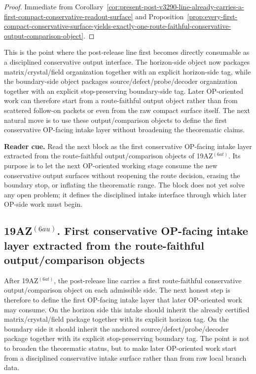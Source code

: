 \begin{proof}
Immediate from Corollary~\ref{cor:present-post-v3290-line-already-carries-a-first-compact-conservative-readout-surface} and Proposition~\ref{prop:every-first-compact-conservative-surface-yields-exactly-one-route-faithful-conservative-output-comparison-object}.
\end{proof}

\begin{remark}
\label{rem:what-the-first-route-faithful-conservative-output-comparison-layer-now-buys}
This is the point where the post-release line first becomes directly consumable as a disciplined conservative output interface. The horizon-side object now packages matrix/crystal/field organization together with an explicit horizon-side tag, while the boundary-side object packages source/defect/probe/decoder organization together with an explicit stop-preserving boundary-side tag. Later OP-oriented work can therefore start from a route-faithful output object rather than from scattered follow-on packets or even from the raw compact surface itself. The next natural move is to use these output/comparison objects to define the first conservative OP-facing intake layer without broadening the theorematic claims.
\end{remark}


\noindent\textbf{Reader cue.} Read the next block as the first conservative OP-facing intake layer extracted from the route-faithful output/comparison objects of 19AZ$^{(6at)}$. Its purpose is to let the next OP-oriented working stage consume the new conservative output surfaces without reopening the route decision, erasing the boundary stop, or inflating the theorematic range. The block does not yet solve any open problem; it defines the disciplined intake interface through which later OP-side work must begin.

\subsection*{19AZ$^{(6au)}$. First conservative OP-facing intake layer extracted from the route-faithful output/comparison objects}
\label{sec:first-conservative-op-facing-intake-layer-extracted-from-the-route-faithful-output-comparison-objects}
After 19AZ$^{(6at)}$, the post-release line carries a first route-faithful conservative output/comparison object on each admissible side. The next honest step is therefore to define the first OP-facing intake layer that later OP-oriented work may consume. On the horizon side this intake should inherit the already certified matrix/crystal/field package together with its explicit horizon tag. On the boundary side it should inherit the anchored source/defect/probe/decoder package together with its explicit stop-preserving boundary tag. The point is not to broaden the theorematic status, but to make later OP-oriented work start from a disciplined conservative intake surface rather than from raw local branch data.

